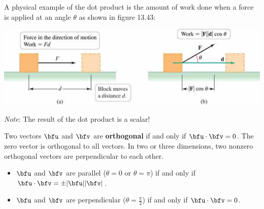 \documentclass[mathNotesPreamble]{subfiles}
\begin{document}
\begin{center}
  \end{center}

  \noindent
  A physical example of the dot product is the amount of work done when a force is applied at an angle $\theta$ as shown in figure 13.43:
  \begin{center}
    \includegraphics[width=0.75\linewidth]{images/briggs_13_03/fig13_43}
    
    \textit{Note}: The result of the dot product is a scalar!
  \end{center}
  \pagebreak
  
  \begin{defn*}
    Two vectors $\bfu$ and $\bfv$ are \textbf{orthogonal} if and only if $\bfu\cdot\bfv=0$. The zero vector is orthogonal to all vectors. In two or three dimensions, two nonzero orthogonal vectors are perpendicular to each other.
  \end{defn*}
  \begin{itemize}
    \item $\bfu$ and $\bfv$ are parallel ($\theta=0$ or $\theta=\pi$) if and only if $\bfu\cdot\bfv=\pm\abs{\bfu}\abs{\bfv}$.
    \item $\bfu$ and $\bfv$ are perpendicular ($\theta=\frac{\pi}{2}$) if and only if $\bfu\cdot\bfv=0$.
  \end{itemize}
  
\end{document}
